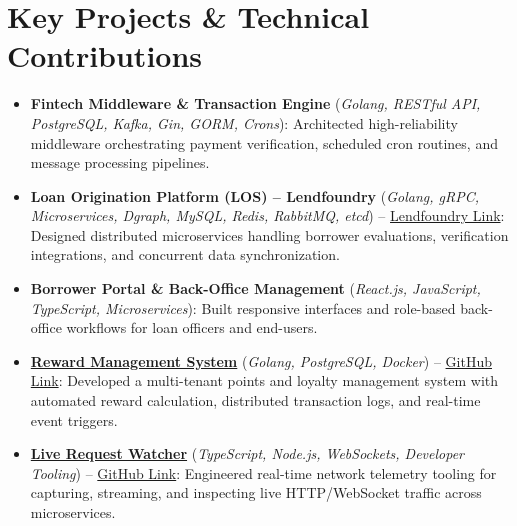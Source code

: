 \section{Key Projects \& Technical Contributions}
\begin{itemize}
  \item \textbf{Fintech Middleware \& Transaction Engine} (\textit{Golang, RESTful API, PostgreSQL, Kafka, Gin, GORM, Crons}): Architected high-reliability middleware orchestrating payment verification, scheduled cron routines, and message processing pipelines.
  \item \textbf{Loan Origination Platform (LOS) -- Lendfoundry} (\textit{Golang, gRPC, Microservices, Dgraph, MySQL, Redis, RabbitMQ, etcd}) -- \href{https://www.lendfoundry.com/}{\color{accent}Lendfoundry Link}: Designed distributed microservices handling borrower evaluations, verification integrations, and concurrent data synchronization.
  \item \textbf{Borrower Portal \& Back-Office Management} (\textit{React.js, JavaScript, TypeScript, Microservices}): Built responsive interfaces and role-based back-office workflows for loan officers and end-users.
  \item \href{https://github.com/lakshay88/reward-management-system}{\textbf{Reward Management System}} (\textit{Golang, PostgreSQL, Docker}) -- \href{https://github.com/lakshay88/reward-management-system}{\color{accent}GitHub Link}: Developed a multi-tenant points and loyalty management system with automated reward calculation, distributed transaction logs, and real-time event triggers.
  \item \href{https://github.com/lakshay88/live-request-watcher}{\textbf{Live Request Watcher}} (\textit{TypeScript, Node.js, WebSockets, Developer Tooling}) -- \href{https://github.com/lakshay88/live-request-watcher}{\color{accent}GitHub Link}: Engineered real-time network telemetry tooling for capturing, streaming, and inspecting live HTTP/WebSocket traffic across microservices.
\end{itemize}
